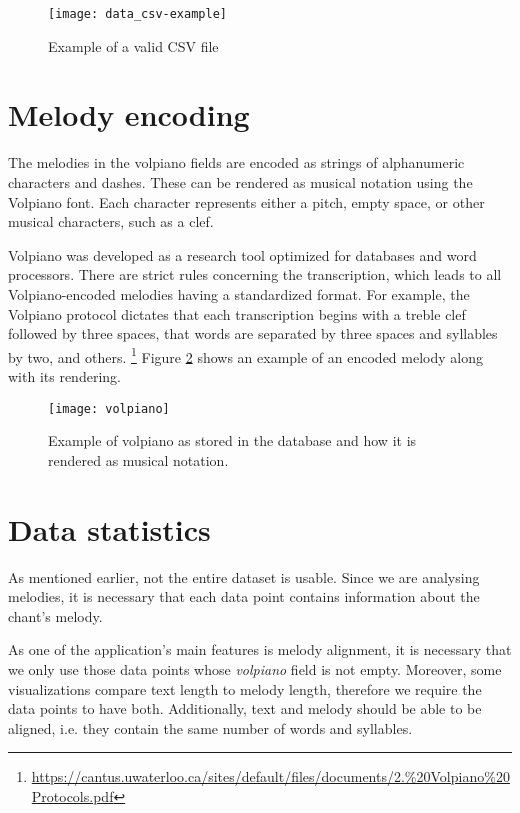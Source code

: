 \begin{figure}[h]
\centering
\texttt{[image: data\_csv-example]}
\caption{Example of a valid CSV file}
\label{fig:csv}
\end{figure}

\section{Melody encoding}

The melodies in the volpiano fields are encoded as strings of alphanumeric characters and dashes. These can be rendered as musical notation using
the Volpiano font. Each character represents either a pitch, empty space, or other musical characters, such as a clef.

Volpiano was developed as a research tool optimized for databases and word processors. There are strict rules concerning the transcription, which leads
to all Volpiano-encoded melodies having a standardized format. For example, the Volpiano protocol dictates that each transcription begins with
a treble clef followed by three spaces, that words are separated by three spaces and syllables by two, and others.
\footnote{\url{https://cantus.uwaterloo.ca/sites/default/files/documents/2.\%20Volpiano\%20Protocols.pdf}} Figure \ref{fig:volpiano} shows an example
of an encoded melody along with its rendering.

\begin{figure}[h!]
\centering
\texttt{[image: volpiano]}
\caption{Example of volpiano as stored in the database and how it is rendered as musical notation. \cite[Figure~2]{cantus_lacoste}}
\label{fig:volpiano}
\end{figure}

\section{Data statistics}

As mentioned earlier, not the entire dataset is usable. Since we are analysing melodies, it is necessary that each data point contains information
about the chant's melody.

As one of the application's main features is melody alignment, it is necessary that we only use those data points whose \emph{volpiano} field is
not empty. Moreover, some visualizations compare text length to melody length, therefore we require the data points to have both. Additionally, 
text and melody should be able to be aligned, i.e. they contain the same number of words and syllables.

